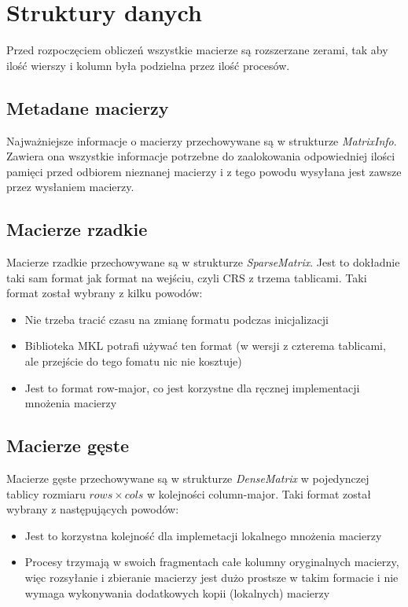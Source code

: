 \documentclass{article}
\begin{document}
\section{Struktury danych}

Przed rozpoczęciem obliczeń wszystkie macierze są rozszerzane zerami, tak aby ilość wierszy i kolumn była podzielna przez ilość procesów.

\subsection{Metadane macierzy}
Najważniejsze informacje o macierzy przechowywane są w strukturze \emph{MatrixInfo}. Zawiera ona wszystkie informacje potrzebne 
do zaalokowania odpowiedniej ilości pamięci przed odbiorem nieznanej macierzy i z tego powodu wysyłana jest zawsze przez wysłaniem 
macierzy.

\subsection{Macierze rzadkie}
Macierze rzadkie przechowywane są w strukturze \emph{SparseMatrix}. Jest to dokładnie taki sam format jak format na wejściu, 
czyli CRS z trzema tablicami.
Taki format został wybrany z kilku powodów:
\begin{itemize}
  \item Nie trzeba tracić czasu na zmianę formatu podczas inicjalizacji
  \item Biblioteka MKL potrafi używać ten format (w wersji z czterema tablicami, ale przejście do tego fomatu nic nie kosztuje)
  \item Jest to format row-major, co jest korzystne dla ręcznej implementacji mnożenia macierzy
\end{itemize}

\subsection{Macierze gęste}
Macierze gęste przechowywane są w strukturze \emph{DenseMatrix} w pojedynczej tablicy rozmiaru $rows \times cols$ w kolejności column-major.
Taki format został wybrany z następujących powodów:
\begin{itemize}
  \item Jest to korzystna kolejność dla implemetacji lokalnego mnożenia macierzy
  \item Procesy trzymają w swoich fragmentach całe kolumny oryginalnych macierzy, więc rozsyłanie i zbieranie macierzy jest dużo prostsze
           w takim formacie i nie wymaga wykonywania dodatkowych kopii (lokalnych) macierzy
\end{itemize} 
\end{document}
